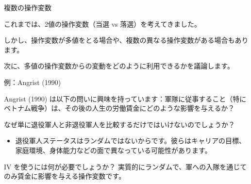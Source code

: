 \documentclass[11pt,handout]{beamer}
\newenvironment{wideitemize}{\itemize\addtolength{\itemsep}{10pt}}{\enditemize}
\begin{document}
\begin{frame}{複数の操作変数}
	\begin{wideitemize}
		\item
		これまでは、2値の操作変数（当選 vs 落選）を考えてきました。
		
		\item
		しかし、操作変数が多値をとる場合や、複数の異なる操作変数がある場合もあります。
		
		
		\item
		次に、多値の操作変数からの変動をどのように利用できるかを議論します。
				
	\end{wideitemize}
\end{frame}

\begin{frame}{例：Angrist (1990)}
	\begin{wideitemize}
		\item
		Angrist (1990) は以下の問いに興味を持っています：軍隊に従事すること（特にベトナム戦争）は、その後の人生の労働賃金にどのような影響を与えるか？ 
		
		\pause
		\item
		なぜ単に退役軍人と非退役軍人を比較するだけではいけないのでしょうか？
			\pause
			\begin{itemize}
				\item 
				退役軍人ステータスはランダムではないからです。彼らはキャリアの目標、家庭環境、身体能力などの面で異なっている可能性があります。
			\end{itemize}
		
		\pause
		\item
		IV を使うには何が必要でしょうか？ \pause 実質的にランダムで、軍への入隊を通じてのみ賃金に影響を与える操作変数です。
	\end{wideitemize}
\end{frame}
\end{document}
